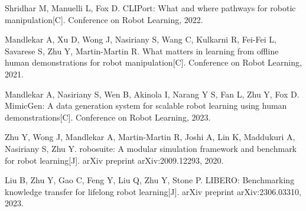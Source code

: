 Shridhar M, Manuelli L, Fox D.
CLIPort: What and where pathways for robotic manipulation[C].
Conference on Robot Learning, 2022.

Mandlekar A, Xu D, Wong J, Nasiriany S, Wang C, Kulkarni R, Fei-Fei L, Savarese S, Zhu Y, Martin-Martin R.
What matters in learning from offline human demonstrations for robot manipulation[C].
Conference on Robot Learning, 2021.

Mandlekar A, Nasiriany S, Wen B, Akinola I, Narang Y S, Fan L, Zhu Y, Fox D.
MimicGen: A data generation system for scalable robot learning using human demonstrations[C].
Conference on Robot Learning, 2023.

Zhu Y, Wong J, Mandlekar A, Martin-Martin R, Joshi A, Lin K, Maddukuri A, Nasiriany S, Zhu Y.
robosuite: A modular simulation framework and benchmark for robot learning[J].
arXiv preprint arXiv:2009.12293, 2020.

Liu B, Zhu Y, Gao C, Feng Y, Liu Q, Zhu Y, Stone P.
LIBERO: Benchmarking knowledge transfer for lifelong robot learning[J].
arXiv preprint arXiv:2306.03310, 2023.